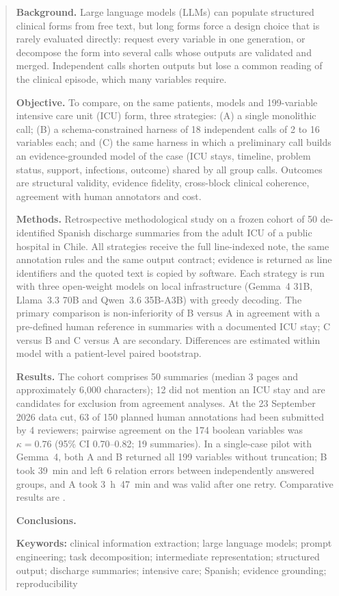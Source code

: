 \begin{abstract}
\noindent\textbf{Background.} Large language models (LLMs) can populate structured clinical forms from free
text, but long forms force a design choice that is rarely evaluated directly: request every variable in one
generation, or decompose the form into several calls whose outputs are validated and merged. Independent calls
shorten outputs but lose a common reading of the clinical episode, which many variables require.

\noindent\textbf{Objective.} To compare, on the same patients, models and 199-variable intensive care unit
(ICU) form, three strategies: (A) a single monolithic call; (B) a schema-constrained harness of 18 independent
calls of 2 to 16 variables each; and (C) the same harness in which a preliminary call builds an
evidence-grounded model of the case (ICU stays, timeline, problem status, support, infections, outcome) shared
by all group calls. Outcomes are structural validity, evidence fidelity, cross-block clinical coherence,
agreement with human annotators and cost.

\noindent\textbf{Methods.} Retrospective methodological study on a frozen cohort of 50 de-identified Spanish
discharge summaries from the adult ICU of a public hospital in Chile. All strategies receive the full
line-indexed note, the same annotation rules and the same output contract; evidence is returned as line
identifiers and the quoted text is copied by software. Each strategy is run with three open-weight models on
local infrastructure (Gemma~4 31B, Llama~3.3 70B and Qwen~3.6 35B-A3B) with greedy decoding. The primary
comparison is non-inferiority of B versus A in agreement with a pre-defined human reference in summaries with a
documented ICU stay; C versus B and C versus A are secondary. Differences are estimated within model with a
patient-level paired bootstrap.

\noindent\textbf{Results.} The cohort comprises 50 summaries (median 3 pages and approximately 6{,}000
characters); 12 did not mention an ICU stay and are candidates for exclusion from agreement analyses. At the
23 September 2026 data cut, 63 of 150 planned human annotations had been submitted by 4 reviewers; pairwise
agreement on the 174 boolean variables was $\kappa=0.76$ (95\% CI 0.70--0.82; 19 summaries). In a single-case
pilot with Gemma~4, both A and B returned all 199 variables without truncation; B took 39~min and left 6
relation errors between independently answered groups, and A took 3~h~47~min and was valid after one retry.
Comparative results are .

\noindent\textbf{Conclusions.} 

\medskip\noindent\textbf{Keywords:} clinical information extraction; large language models; prompt
engineering; task decomposition; intermediate representation; structured output; discharge summaries;
intensive care; Spanish; evidence grounding; reproducibility
\end{abstract}

